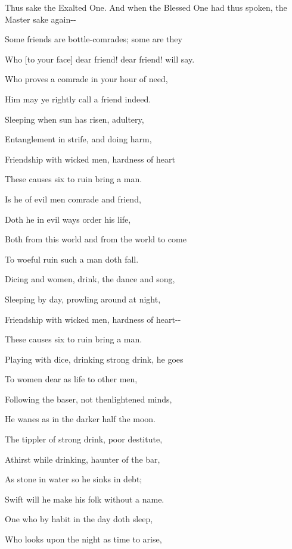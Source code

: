\documentclass[12pt,twoside]{article}
\begin{document}
Thus sake the Exalted One. And when the Blessed One had thus spoken, the
Master sake again{}-{}-


\bigskip

Some friends are bottle{}-comrades; some are they

Who [to your face] dear friend! dear friend! will say.

Who proves a comrade in your hour of need,

Him may ye rightly call a friend indeed.


\bigskip

Sleeping when sun has risen, adultery,

Entanglement in strife, and doing harm,

Friendship with wicked men, hardness of heart

These causes six to ruin bring a man.

Is he of evil men comrade and friend,

Doth he in evil ways order his life,

Both from this world and from the world to come

To woeful ruin such a man doth fall.


\bigskip

Dicing and women, drink, the dance and song,

Sleeping by day, prowling around at night,

Friendship with wicked men, hardness of heart{}-{}-

These causes six to ruin bring a man.


\bigskip

Playing with dice, drinking strong drink, he goes

To women dear as life to other men,

Following the baser, not th{\textquotesingle}enlightened minds,

He wanes as in the darker half the moon.


\bigskip

The tippler of strong drink, poor destitute,

Athirst while drinking, haunter of the bar,

As stone in water so he sinks in debt;

Swift will he make his folk without a name.


\bigskip

One who by habit in the day doth sleep,

Who looks upon the night as time to arise,
\end{document}
